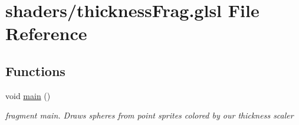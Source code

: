 \hypertarget{thickness_frag_8glsl}{\section{shaders/thickness\-Frag.glsl File Reference}
\label{thickness_frag_8glsl}
}
\subsection*{Functions}
\begin{DoxyCompactItemize}
\item 
\hypertarget{thickness_frag_8glsl_acdef7a1fd863a6d3770c1268cb06add3}{void \hyperlink{thickness_frag_8glsl_acdef7a1fd863a6d3770c1268cb06add3}{main} ()}\label{thickness_frag_8glsl_acdef7a1fd863a6d3770c1268cb06add3}

\begin{DoxyCompactList}\small\item\em fragment main. Draws spheres from point sprites colored by our thickness scaler \end{DoxyCompactList}\end{DoxyCompactItemize}

